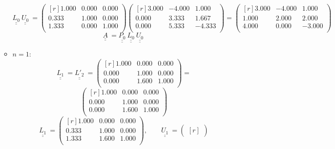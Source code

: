 \documentclass{report}[10pts]
\begin{document}
\begin{enumerate}[- Ex. 1]
\begin{itemize}
\[   \underline{\underline{L_{0}}}~
   \underline{\underline{U_{0}}}~
   =
      \begin{pmatrix*}[r]
         1.000 & 0.000 & 0.000\\
         0.333 & 1.000 & 0.000\\
         1.333 & 0.000 & 1.000\\
      \end{pmatrix*}
      \begin{pmatrix*}[r]
         3.000 & -4.000 & 1.000\\
         0.000 & 3.333 & 1.667\\
         0.000 & 5.333 & -4.333\\
      \end{pmatrix*}
   =
      \begin{pmatrix*}[r]
         3.000 & -4.000 & 1.000\\
         1.000 & 2.000 & 2.000\\
         4.000 & 0.000 & -3.000\\
      \end{pmatrix*}
\]
\[
   \underline{\underline{A}}~
   =
   \underline{\underline{P_{0}}}~
   \underline{\underline{L_{0}}}~
   \underline{\underline{U_{0}}}~
\]
\item $n=1$:
\[
   \underline{\underline{L_{1}}}~
   =
   \underline{\underline{L'_{2}}}~
   =
      \begin{pmatrix}[r]
         1.000 & 0.000 & 0.000\\
         0.000 & 1.000 & 0.000\\
         0.000 & 1.600 & 1.000\\
      \end{pmatrix}
   =
\]
\[
      \begin{pmatrix*}[r]
         1.000 & 0.000 & 0.000\\
         0.000 & 1.000 & 0.000\\
         0.000 & 1.600 & 1.000\\
      \end{pmatrix*}
\]
\[
   \underline{\underline{L_{1}}}~
   =
      \begin{pmatrix*}[r]
         1.000 & 0.000 & 0.000\\
         0.333 & 1.000 & 0.000\\
         1.333 & 1.600 & 1.000\\
      \end{pmatrix*}
   ,\qquad
   \underline{\underline{U_{1}}}~
   =
      \begin{pmatrix*}[r]

\end{pmatrix*}\]
\end{itemize}
\end{enumerate}
\end{document}
